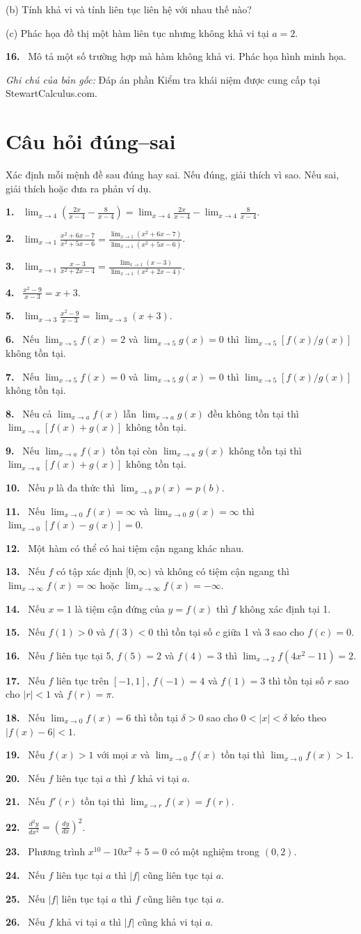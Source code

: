\documentclass[12pt,a4paper]{article}
\newcommand{\bt}[1]{\par\smallskip\noindent\textbf{#1.}\ }
\begin{document}
(b) Tính khả vi và tính liên tục liên hệ với nhau thế nào?

(c) Phác họa đồ thị một hàm liên tục nhưng không khả vi tại $a=2$.
\bt{16} Mô tả một số trường hợp mà hàm không khả vi. Phác họa hình minh họa.

\noindent\textit{Ghi chú của bản gốc:} Đáp án phần Kiểm tra khái niệm được cung cấp tại StewartCalculus.com.
\medskip
\section*{Câu hỏi đúng–sai}
Xác định mỗi mệnh đề sau đúng hay sai. Nếu đúng, giải thích vì sao. Nếu sai, giải thích hoặc đưa ra phản ví dụ.
\bt{1} $\displaystyle\lim_{x\to4}\left(\frac{2x}{x-4}-\frac8{x-4}\right)=\lim_{x\to4}\frac{2x}{x-4}-\lim_{x\to4}\frac8{x-4}$.
\bt{2} $\displaystyle\lim_{x\to1}\frac{x^2+6x-7}{x^2+5x-6}=\frac{\lim_{x\to1}(x^2+6x-7)}{\lim_{x\to1}(x^2+5x-6)}$.
\bt{3} $\displaystyle\lim_{x\to1}\frac{x-3}{x^2+2x-4}=\frac{\lim_{x\to1}(x-3)}{\lim_{x\to1}(x^2+2x-4)}$.
\bt{4} $\displaystyle\frac{x^2-9}{x-3}=x+3$.
\bt{5} $\displaystyle\lim_{x\to3}\frac{x^2-9}{x-3}=\lim_{x\to3}(x+3)$.
\bt{6} Nếu $\lim_{x\to5}f(x)=2$ và $\lim_{x\to5}g(x)=0$ thì $\lim_{x\to5}[f(x)/g(x)]$ không tồn tại.
\bt{7} Nếu $\lim_{x\to5}f(x)=0$ và $\lim_{x\to5}g(x)=0$ thì $\lim_{x\to5}[f(x)/g(x)]$ không tồn tại.
\bt{8} Nếu cả $\lim_{x\to a}f(x)$ lẫn $\lim_{x\to a}g(x)$ đều không tồn tại thì $\lim_{x\to a}[f(x)+g(x)]$ không tồn tại.
\bt{9} Nếu $\lim_{x\to a}f(x)$ tồn tại còn $\lim_{x\to a}g(x)$ không tồn tại thì $\lim_{x\to a}[f(x)+g(x)]$ không tồn tại.
\bt{10} Nếu $p$ là đa thức thì $\lim_{x\to b}p(x)=p(b)$.
\bt{11} Nếu $\lim_{x\to0}f(x)=\infty$ và $\lim_{x\to0}g(x)=\infty$ thì $\lim_{x\to0}[f(x)-g(x)]=0$.
\bt{12} Một hàm có thể có hai tiệm cận ngang khác nhau.
\bt{13} Nếu $f$ có tập xác định $[0,\infty)$ và không có tiệm cận ngang thì $\lim_{x\to\infty}f(x)=\infty$ hoặc $\lim_{x\to\infty}f(x)=-\infty$.
\bt{14} Nếu $x=1$ là tiệm cận đứng của $y=f(x)$ thì $f$ không xác định tại 1.
\bt{15} Nếu $f(1)>0$ và $f(3)<0$ thì tồn tại số $c$ giữa 1 và 3 sao cho $f(c)=0$.
\bt{16} Nếu $f$ liên tục tại 5, $f(5)=2$ và $f(4)=3$ thì $\lim_{x\to2}f(4x^2-11)=2$.
\bt{17} Nếu $f$ liên tục trên $[-1,1]$, $f(-1)=4$ và $f(1)=3$ thì tồn tại số $r$ sao cho $|r|<1$ và $f(r)=\pi$.
\bt{18} Nếu $\lim_{x\to0}f(x)=6$ thì tồn tại $\delta>0$ sao cho $0<|x|<\delta$ kéo theo $|f(x)-6|<1$.
\bt{19} Nếu $f(x)>1$ với mọi $x$ và $\lim_{x\to0}f(x)$ tồn tại thì $\lim_{x\to0}f(x)>1$.
\bt{20} Nếu $f$ liên tục tại $a$ thì $f$ khả vi tại $a$.
\bt{21} Nếu $f'(r)$ tồn tại thì $\lim_{x\to r}f(x)=f(r)$.
\bt{22} $\displaystyle\frac{d^2y}{dx^2}=\left(\frac{dy}{dx}\right)^2$.
\bt{23} Phương trình $x^{10}-10x^2+5=0$ có một nghiệm trong $(0,2)$.
\bt{24} Nếu $f$ liên tục tại $a$ thì $|f|$ cũng liên tục tại $a$.
\bt{25} Nếu $|f|$ liên tục tại $a$ thì $f$ cũng liên tục tại $a$.
\bt{26} Nếu $f$ khả vi tại $a$ thì $|f|$ cũng khả vi tại $a$.
\medskip
\end{document}
